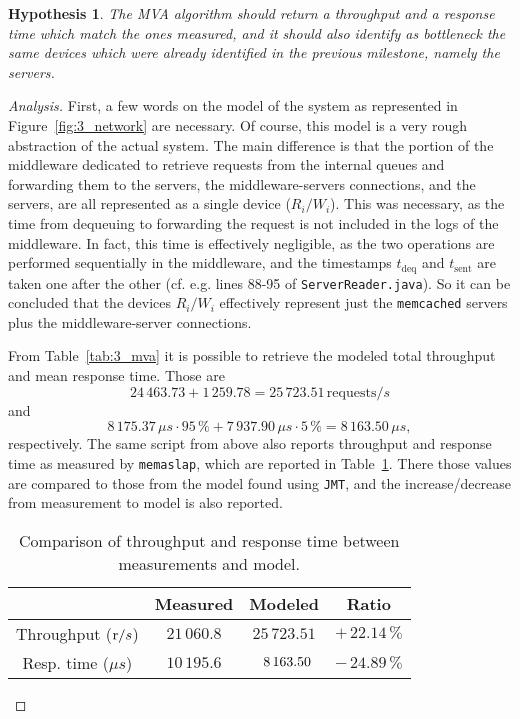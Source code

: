 \documentclass[11pt]{article}
\newtheorem{hyp}{Hypothesis}
\theoremstyle{definition}
\newenvironment{ana}[1][\proofname]{\begin{proof}[Analysis]}{\end{proof}}
\newcommand\Tdeq{t_{\mathrm{deq}}}
\newcommand\Tsent{t_{\mathrm{sent}}}
\renewcommand\t\texttt
\newcommand\wh[1]{{\color[HTML]{FFFFFF}#1}}
\begin{document}
\begin{hyp}
    The MVA algorithm should return a throughput and a response time which match the ones measured, and it should also identify as bottleneck the same devices which were already %
    identified in the previous milestone, namely the servers.
\end{hyp}
\begin{ana}
    First, a few words on the model of the system as represented in Figure~\ref{fig:3_network} are necessary.
    Of course, this model is a very rough abstraction of the actual system.
    The main difference is that the portion of the middleware dedicated to retrieve requests from the internal queues and forwarding them to the servers, the middleware-servers connections, and the servers, are all represented as a single device ($R_i/W_i$).
    This was necessary, as the time from dequeuing to forwarding the request is not included in the logs of the middleware.
    In fact, this time is effectively negligible, as the two operations are performed sequentially in the middleware, and the timestamps $\Tdeq$ and $\Tsent$ are taken one after the other (cf. e.g. lines 88-95 of \t{ServerReader.java}).
    So it can be concluded that the devices $R_i/W_i$ effectively represent just the \t{memcached} servers plus the middleware-server connections.
    
    From Table~\ref{tab:3_mva} it is possible to retrieve the modeled total throughput and mean response time.
    Those are
    \[24\,463.73+1\,259.78=25\,723.51\,\text{requests}/s\]
    and
    \[8\,175.37\,\mu s\cdot95\,\%+7\,937.90\,\mu s\cdot5\,\%=8\,163.50\,\mu s,\]
    respectively.
    The same script from above also reports throughput and response time as measured by \t{memaslap}, which are reported in Table~\ref{tab:3_comp}.
    There those values are compared to those from the model found using \t{JMT}, and the increase/decrease from measurement to model is also reported.

    \begin{table}[h!]
        \centering
        \small
        {
            \begin{tabular}{|c|c|c|c|}
                \hline
                \rowcolor{Gray}
                & Measured & Modeled & Ratio \\
                \hline
                \cellcolor{Gray} Throughput ($\text r/s$) & $21\,060.8$ & $25\,723.51$ & $+\,22.14\,\%$ \\
                \hline
                \cellcolor{Gray} Resp. time ($\mu s$) & $10\,195.6$ & $\wh08\,163.50$ & $-\,24.89\,\%$ \\
                \hline
            \end{tabular}
        }
        \caption{Comparison of throughput and response time between measurements and model.}
        \label{tab:3_comp}
    \end{table}


\end{ana}
\end{document}
